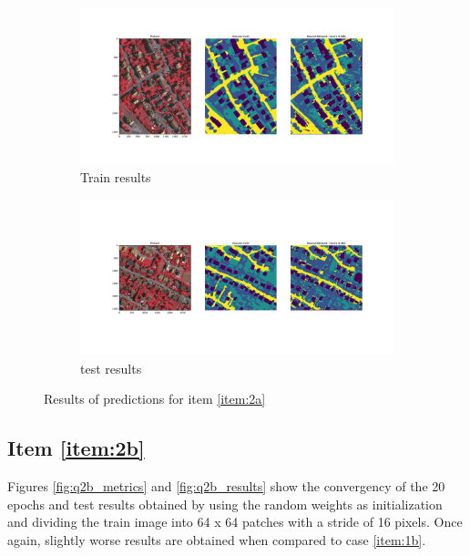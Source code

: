 \documentclass[10pt, a4paper]{article}
\begin{document}
\begin{figure}[htpb]
  \centering
  \begin{subfigure}[b]{0.45\textwidth}
      \centering
      \includegraphics[width=\textwidth]{images/Patch32_scratch_train.pdf}
      \caption{Train results}
      \label{fig:q2a_train}
  \end{subfigure}
  \hspace{0.05\textwidth}
  \begin{subfigure}[b]{0.45\textwidth}
    \centering
    \includegraphics[width=\textwidth]{images/Patch32_scratch_test.pdf}
    \caption{test results}
    \label{fig:q2a_test}
  \end{subfigure}
  \caption{Results of predictions for item \ref{item:2a}}
  \label{fig:q2a_results}
\end{figure}

\subsection{Item \ref{item:2b}}

Figures \ref{fig:q2b_metrics} and \ref{fig:q2b_results} show the convergency of the 20 epochs and test results obtained by using the random weights as initialization 
and dividing the train image into 64 x 64 patches with a stride of 16 pixels. Once again, slightly worse results are obtained when compared to case \ref{item:1b}.
\end{document}
